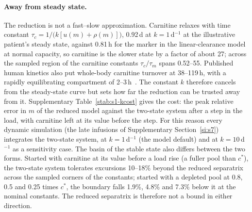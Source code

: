 \paragraph{Away from steady state.} The reduction is not a fast--slow approximation.
Carnitine relaxes with time constant $\tau_c=1/\bigl(k[u(m)+\rho(m)]\bigr)$, 0.92\,d at
$k=1$\,d$^{-1}$ at the illustrative patient's steady state, against 0.81\,h for the marker
in the linear-clearance model at normal capacity, so carnitine is the slower state by a
factor of about 27; across the sampled region of the carnitine constants $\tau_c/\tau_m$
spans 0.52--55. Published human kinetics also put whole-body carnitine
turnover at 38--119\,h, with a rapidly equilibrating compartment of 2--3\,h~\cite{carnitine_turnover}.
The constant $k$ therefore cancels from the steady-state curve but sets how far the reduction
can be trusted away from it. Supplementary Table~\ref{stab:s1-kcost} gives the cost: the peak
relative error in $m$ of the reduced model against the two-state system after a step in the
load, with carnitine left at its value before the step. For this reason every dynamic
simulation (the late infusions of Supplementary Section~\ref{si:s7}) integrates the two-state
system, at $k=1$\,d$^{-1}$ (the model default) and at $k=10$\,d$^{-1}$ as a sensitivity case.
The basin of the stable state also differs between the two forms. Started with carnitine at
its value before a load rise (a fuller pool than $c^{\ast}$), the two-state system tolerates
excursions 10--18\% beyond the reduced separatrix across the sampled corners of the
constants; started with a depleted pool at 0.8, 0.5 and 0.25 times $c^{\ast}$, the boundary
falls 1.9\%, 4.8\% and 7.3\% below it at the nominal constants. The reduced separatrix is
therefore not a bound in either direction.

